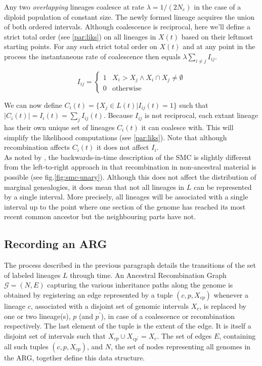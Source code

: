 \documentclass{article}
\begin{document}
Any two \emph{overlapping} lineages coalesce at rate $\lambda = 1/(2N_e)$ in the case
of a diploid population of constant size. The newly formed lineage acquires the 
union of both ordered intervals.
Although coalescence is reciprocal, here we'll define a strict total order 
(see \ref{par:liks}) on 
all lineages in $X(t)$ based on their leftmost starting points. 
For any such strict total order on $X(t)$ and at any point in the process 
the instantaneous rate of coalescence then equals $\lambda \sum_{i \neq j} I_{ij}$.

\begin{equation} \label{def:coal}
I_{ij} = \begin{cases}
1 & X_i > X_j \wedge X_i \cap X_j \neq \emptyset \\
0 & \text{otherwise}
\end{cases}
\end{equation}

We can now define $C_i(t) = \{X_j \in L(t) | I_{ij}(t) = 1\}$ such that $|C_i(t)| = 
I_{i}(t) = \sum_{j} I_{ij}(t)$.
Because $I_{ij}$ is not reciprocal, each extant lineage has their own unique set of 
lineages $C_i(t)$ it can coalesce with. This will simplify the likelihood computations 
(see \ref{par:liks}). Note that although recombination affects $C_i(t)$ it does not 
affect $I_{i}$.\\ 

As noted by \cite{mcvean_approximating_2005}, the backwards-in-time description of the 
SMC is slightly different from the left-to-right approach in that recombination 
in non-ancestral material is possible (see fig.\ref{fig:smc-unary}). 
Although this does not affect the distribution 
of marginal genealogies, it does mean that not all lineages in $L$ can be represented 
by a single interval. More precisely, all lineages will be associated with 
a single interval up to the point where one section of the 
genome has reached its most recent common ancestor but the neighbouring parts have not.

\subsection{Recording an ARG} \label{par:recording}

The process described in the previous paragraph details the transitions of the 
set of labeled lineages $L$ through time. An Ancestral Recombination Graph 
$\mathcal{G} = (N, E)$ capturing the various inheritance paths along the genome 
is obtained by registering an edge represented by a tuple $(c, p, X_{cp})$ 
whenever a lineage $c$, associated with a disjoint set of genomic intervals $X_c$, is 
replaced by one or two lineage(s), $p$ (and $p^{\prime}$), 
in case of a coalescence or recombination respectively.
The last element of the tuple is the extent of the edge. It is itself a  
disjoint set of intervals such that $X_{cp} \cup X_{cp^{\prime}} = X_c$. 
The set of edges $E$, containing all such tuples $(c, p, X_{cp})$, 
and $N$, the set of nodes representing all genomes in the ARG, together
define this data structure.\\
\end{document}
